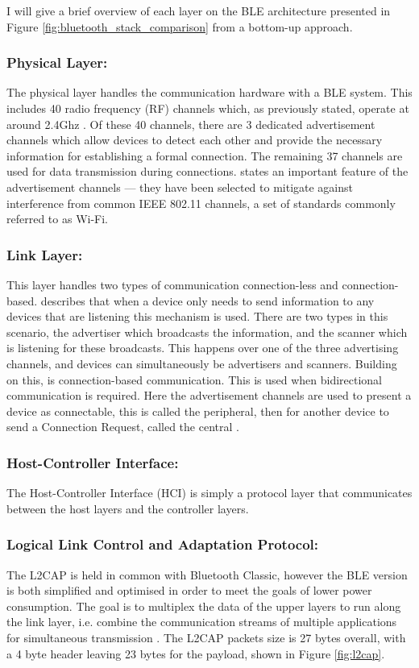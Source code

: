 \documentclass{l4proj}
\begin{document}
I will give a brief overview of each layer on the BLE architecture presented in Figure \ref{fig:bluetooth_stack_comparison} from a bottom-up approach.

\subsubsection{Physical Layer:} The physical layer handles the communication hardware with a BLE system. This includes 40 radio frequency (RF) channels which, as previously stated, operate at around 2.4Ghz \citep{yang_beyond_2020}. Of these 40 channels, there are 3 dedicated advertisement channels which allow devices to detect each other and provide the necessary information for establishing a formal connection. The remaining 37 channels are used for data transmission during connections. \citet{gomez_overview_2012} states an important feature of the advertisement channels — they have been selected to mitigate against interference from common IEEE 802.11 channels, a set of standards commonly referred to as Wi-Fi.

\subsubsection{Link Layer:} This layer handles two types of communication connection-less and connection-based. \citet{yang_beyond_2020} describes that when a device only needs to send information to any devices that are listening this mechanism is used. There are two types in this scenario, the advertiser which broadcasts the information, and the scanner which is listening for these broadcasts. This happens over one of the three advertising channels, and devices can simultaneously be advertisers and scanners. Building on this, is connection-based communication. This is used when bidirectional communication is required. Here the advertisement channels are used to present a device as connectable, this is called the peripheral, then for another device to send a Connection Request, called the central \citep{gomez_overview_2012}.

\subsubsection{Host-Controller Interface:} The Host-Controller Interface (HCI) is simply a protocol layer that communicates between the host layers and the controller layers.

\subsubsection{Logical Link Control and Adaptation Protocol:} The L2CAP is held in common with Bluetooth Classic, however the BLE version is both simplified and optimised in order to meet the goals of lower power consumption. The goal is to multiplex the data of the upper layers to run along the link layer, i.e. combine the communication streams of multiple applications for simultaneous transmission \citep{gomez_overview_2012}. The L2CAP packets size is 27 bytes overall, with a 4 byte header leaving 23 bytes for the payload, shown in Figure \ref{fig:l2cap}.
\end{document}

